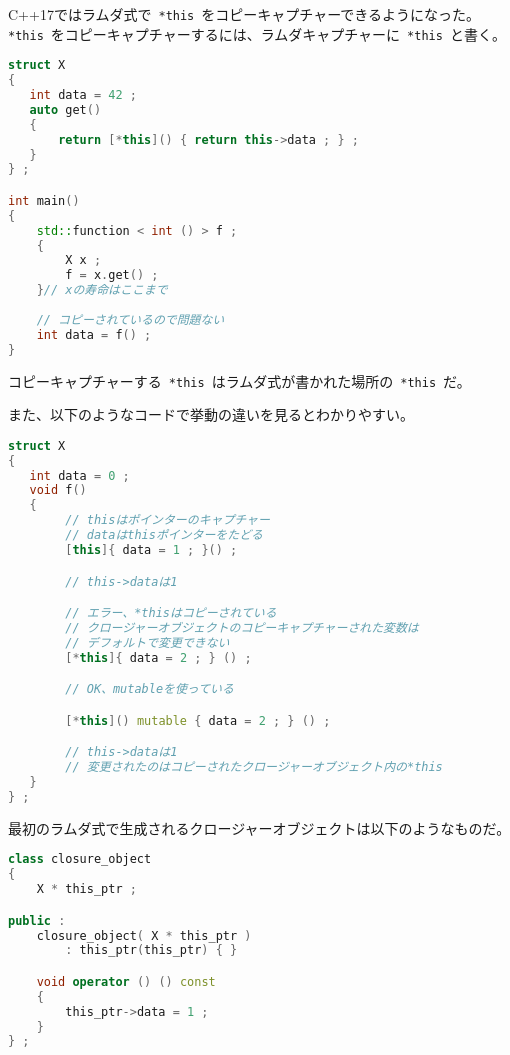 %

C++17ではラムダ式で~\lstinline!*this!~をコピーキャプチャーできるようになった。\lstinline!*this!~をコピーキャプチャーするには、ラムダキャプチャーに~\lstinline!*this!~と書く。

\begin{lstlisting}[language=C++]
struct X
{
   int data = 42 ;
   auto get()
   {
       return [*this]() { return this->data ; } ;
   }
} ;

int main()
{
    std::function < int () > f ;
    {
        X x ;
        f = x.get() ;
    }// xの寿命はここまで
    
    // コピーされているので問題ない
    int data = f() ;
}
\end{lstlisting}

コピーキャプチャーする~\lstinline!*this!~はラムダ式が書かれた場所の~\lstinline!*this!~だ。

また、以下のようなコードで挙動の違いを見るとわかりやすい。

\begin{lstlisting}[language=C++]
struct X
{
   int data = 0 ;
   void f()
   {
        // thisはポインターのキャプチャー
        // dataはthisポインターをたどる
        [this]{ data = 1 ; }() ;

        // this->dataは1

        // エラー、*thisはコピーされている
        // クロージャーオブジェクトのコピーキャプチャーされた変数は
        // デフォルトで変更できない
        [*this]{ data = 2 ; } () ;

        // OK、mutableを使っている

        [*this]() mutable { data = 2 ; } () ;

        // this->dataは1
        // 変更されたのはコピーされたクロージャーオブジェクト内の*this        
   }
} ;
\end{lstlisting}

最初のラムダ式で生成されるクロージャーオブジェクトは以下のようなものだ。

\begin{lstlisting}[language=C++]
class closure_object
{
    X * this_ptr ;

public :
    closure_object( X * this_ptr )
        : this_ptr(this_ptr) { }

    void operator () () const
    {
        this_ptr->data = 1 ;
    }
} ;
\end{lstlisting}

